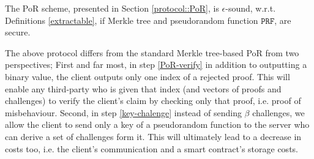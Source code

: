 %
%
%

\begin{theorem}
The PoR scheme, presented in Section \ref{protocol::PoR}, is $\epsilon$-sound, w.r.t. Definitions \ref{extractable}, if Merkle tree and pseudorandom function $\mathtt{PRF}$, are secure. 

\end{theorem}


 The above protocol differs from the standard Merkle tree-based PoR from two perspectives; First and far most,  in step \ref{PoR-verify} in addition to outputting a binary value, the client outputs only one index of a rejected proof. This will enable any third-party who is given that index (and vectors of proofs and challenges) to verify the client's claim by checking only that proof, i.e. proof of misbehaviour. Second,   in step \ref{key-chalenge} instead of sending $\beta$ challenges, we allow the client to send only a key of a pseudorandom function to the server who can derive a set of challenges form it. This will ultimately  lead to a decrease in costs too, i.e. the client's communication and a smart contract's storage costs.   
 
